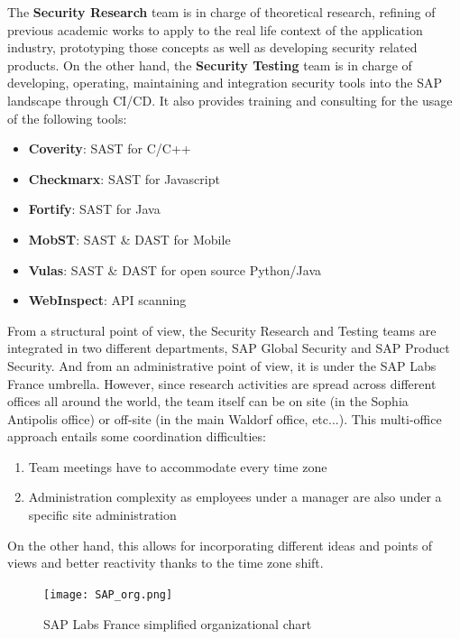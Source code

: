 \documentclass[11pt]{article}
\begin{document}
The \textbf{Security Research} team is in charge of theoretical research, refining of previous academic works to apply to the real life context of the application industry, prototyping those concepts as well as developing security related products. On the other hand, the \textbf{Security Testing} team is in charge of developing, operating, maintaining and integration security tools into the SAP landscape through CI/CD. It also provides training and consulting for the usage of the following tools:

\begin{itemize}
    \item \textbf{Coverity}: SAST for C/C++
    \item \textbf{Checkmarx}: SAST for Javascript
    \item \textbf{Fortify}: SAST for Java
    \item \textbf{MobST}: SAST \& DAST for Mobile
    \item \textbf{Vulas}: SAST \& DAST for open source Python/Java
    \item \textbf{WebInspect}: API scanning
\end{itemize}

From a structural point of view, the Security Research and Testing teams are integrated in two different departments, SAP Global Security and SAP Product Security. And from an administrative point of view, it is under the SAP Labs France umbrella. However, since   research activities are spread across different offices all around the world, the team itself can be on site (in the Sophia Antipolis office) or off-site (in the main Waldorf office, etc...). This multi-office approach entails some coordination difficulties:

\begin{enumerate}
    \item Team meetings have to accommodate every time zone
    \item Administration complexity as employees under a manager are also under a specific site administration
\end{enumerate}

On the other hand, this allows for incorporating different ideas and points of views and better reactivity thanks to the time zone shift.

\vspace{3mm}
\begin{figure}[h]
    \centering
    \texttt{[image: SAP\_org.png]}
    \caption{SAP Labs France simplified organizational chart}
    \label{fig:sap_org}
\end{figure}
\end{document}
